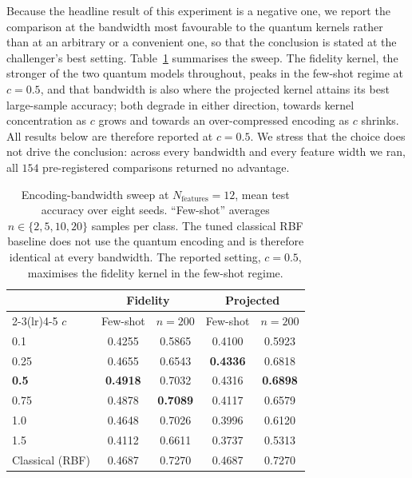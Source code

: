 Because the headline result of this experiment is a negative one, we report the
comparison at the bandwidth most favourable to the quantum kernels rather than at an
arbitrary or a convenient one, so that the conclusion is stated at the challenger's best
setting. Table~\ref{tab:qsvm_bandwidth} summarises the sweep. The fidelity kernel, the
stronger of the two quantum models throughout, peaks in the few-shot regime at $c = 0.5$,
and that bandwidth is also where the projected kernel attains its best large-sample
accuracy; both degrade in either direction, towards kernel concentration as $c$ grows and
towards an over-compressed encoding as $c$ shrinks. All results below are therefore
reported at $c = 0.5$. We stress that the choice does not drive the conclusion: across
every bandwidth and every feature width we ran, all $154$ pre-registered comparisons
returned no advantage.

\begin{table}[h]
    \centering
    \caption{Encoding-bandwidth sweep at $N_{\text{features}} = 12$, mean test accuracy over eight seeds. ``Few-shot'' averages $n \in \{2,5,10,20\}$ samples per class. The tuned classical RBF baseline does not use the quantum encoding and is therefore identical at every bandwidth. The reported setting, $c = 0.5$, maximises the fidelity kernel in the few-shot regime.}
    \label{tab:qsvm_bandwidth}
    \begin{tabular}{@{}lcccc@{}}
        \toprule
                        & \multicolumn{2}{c}{\textbf{Fidelity}} & \multicolumn{2}{c}{\textbf{Projected}}                                     \\
        \cmidrule(lr){2-3}\cmidrule(lr){4-5}
        \textbf{$c$}    & Few-shot                              & $n{=}200$                              & Few-shot        & $n{=}200$       \\ \midrule
        0.1             & 0.4255                                & 0.5865                                 & 0.4100          & 0.5923          \\
        0.25            & 0.4655                                & 0.6543                                 & \textbf{0.4336} & 0.6818          \\
        \textbf{0.5}    & \textbf{0.4918}                       & 0.7032                                 & 0.4316          & \textbf{0.6898} \\
        0.75            & 0.4878                                & \textbf{0.7089}                        & 0.4117          & 0.6579          \\
        1.0             & 0.4648                                & 0.7026                                 & 0.3996          & 0.6120          \\
        1.5             & 0.4112                                & 0.6611                                 & 0.3737          & 0.5313          \\ \midrule
        Classical (RBF) & 0.4687                                & 0.7270                                 & 0.4687          & 0.7270          \\ \bottomrule
    \end{tabular}
\end{table}

